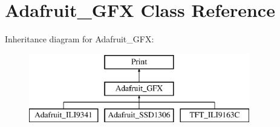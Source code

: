 \hypertarget{class_adafruit___g_f_x}{}\section{Adafruit\+\_\+\+G\+F\+X Class Reference}
\label{class_adafruit___g_f_x}
Inheritance diagram for Adafruit\+\_\+\+G\+F\+X\+:\begin{figure}[H]
\begin{center}
\leavevmode
\includegraphics[height=3.000000cm]{class_adafruit___g_f_x}
\end{center}
\end{figure}
